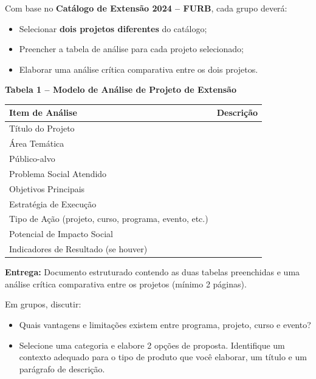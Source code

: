 \documentclass[12pt,a4paper]{article}
\begin{document}
\begin{boxAtividade}

Com base no \textbf{Catálogo de Extensão 2024 – FURB}, cada grupo deverá:

\begin{itemize}
    \item Selecionar \textbf{dois projetos diferentes} do catálogo;
    \item Preencher a tabela de análise para cada projeto selecionado;
    \item Elaborar uma análise crítica comparativa entre os dois projetos.
\end{itemize}

\textbf{Tabela 1 – Modelo de Análise de Projeto de Extensão}

\begin{center}
\renewcommand{\arraystretch}{1.3}
\begin{tabular}{|p{4cm}|p{9cm}|}
\hline
\textbf{Item de Análise} & \textbf{Descrição} \\ \hline
Título do Projeto & \\ \hline
Área Temática & \\ \hline
Público-alvo & \\ \hline
Problema Social Atendido & \\ \hline
Objetivos Principais & \\ \hline
Estratégia de Execução & \\ \hline
Tipo de Ação (projeto, curso, programa, evento, etc.) & \\ \hline
Potencial de Impacto Social & \\ \hline
Indicadores de Resultado (se houver) & \\ \hline
\end{tabular}
\end{center}

\bigskip

\textbf{Entrega:} Documento estruturado contendo as duas tabelas preenchidas e uma análise crítica comparativa entre os projetos (mínimo 2 páginas).

\end{boxAtividade}



\bigskip

\begin{boxAtividade}
Em grupos, discutir:

\begin{itemize}
    \item Quais vantagens e limitações existem entre programa, projeto, curso e evento?
    \item Selecione uma categoria e elabore 2 opções de proposta. Identifique um contexto adequado para o tipo de produto que você elaborar, um título e um parágrafo de descrição. 
\end{itemize}
\end{boxAtividade}
\end{document}
